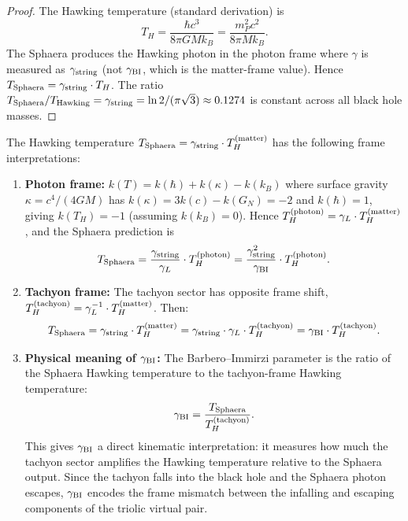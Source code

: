 \begin{proof}
The Hawking temperature (standard derivation) is
\[
T_H = \frac{\hbar c^3}{8\pi G M k_B} = \frac{m_P^2 c^2}{8\pi M k_B}.
\]
The Sphaera produces the Hawking photon in the photon frame where
$\gamma$ is measured as $\gamma_{\mathrm{string}}$ (not $\gamma_{\mathrm{BI}}$, which is the
matter-frame value).
Hence $T_{\mathrm{Sphaera}} = \gamma_{\mathrm{string}}\cdot T_H$.
The ratio $T_{\mathrm{Sphaera}}/T_{\mathrm{Hawking}}=\gamma_{\mathrm{string}}
=\ln 2/(\pi\sqrt{3})\approx 0.1274$ is constant across all black hole
masses.
\end{proof}

\begin{proposition}
\label{prop:hawking-gBI-tachyon}
The Hawking temperature $T_{\mathrm{Sphaera}} = \gamma_{\mathrm{string}}\cdot T_H^{(\mathrm{matter})}$
has the following frame interpretations:
\begin{enumerate}[label=(\roman*)]
 \item \textbf{Photon frame:} $k(T) = k(\hbar) + k(\kappa) - k(k_B)$
 where surface gravity $\kappa = c^4/(4GM)$ has
 $k(\kappa) = 3k(c) - k(G_N) = -2$ and $k(\hbar) = 1$,
 giving $k(T_H) = -1$ (assuming $k(k_B)=0$).
 Hence $T_H^{(\mathrm{photon})} = \gamma_L \cdot T_H^{(\mathrm{matter})}$,
 and the Sphaera prediction is
 \[
 T_{\mathrm{Sphaera}} = \frac{\gamma_{\mathrm{string}}}{\gamma_L}\cdot T_H^{(\mathrm{photon})}
 = \frac{\gamma_{\mathrm{string}}^2}{\gamma_{\mathrm{BI}}}\cdot T_H^{(\mathrm{photon})}.
 \]
 \item \textbf{Tachyon frame:} The tachyon sector has opposite frame shift,
 $T_H^{(\mathrm{tachyon})} = \gamma_L^{-1}\cdot T_H^{(\mathrm{matter})}$. Then:
 \[
 T_{\mathrm{Sphaera}}
 = \gamma_{\mathrm{string}}\cdot T_H^{(\mathrm{matter})}
 = \gamma_{\mathrm{string}}\cdot\gamma_L\cdot T_H^{(\mathrm{tachyon})}
 = \gamma_{\mathrm{BI}}\cdot T_H^{(\mathrm{tachyon})}.
 \]
 \item \textbf{Physical meaning of $\gamma_{\mathrm{BI}}$:} The Barbero--Immirzi parameter
 is the ratio of the Sphaera Hawking temperature to the tachyon-frame
 Hawking temperature:
 \[
 \gamma_{\mathrm{BI}} = \frac{T_{\mathrm{Sphaera}}}{T_H^{(\mathrm{tachyon})}}.
 \]
 This gives $\gamma_{\mathrm{BI}}$ a direct kinematic interpretation: it measures how much
 the tachyon sector amplifies the Hawking temperature relative to the
 Sphaera output. Since the tachyon falls into the black hole and the
 Sphaera photon escapes, $\gamma_{\mathrm{BI}}$ encodes the frame mismatch between the
 infalling and escaping components of the triolic virtual pair.
\end{enumerate}
\end{proposition}

